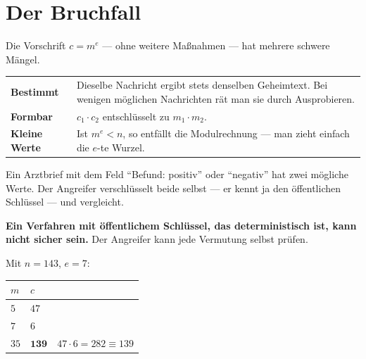 \begin{merksatz}
\begin{center}
\begin{minipage}{0.88\textwidth}
\end{minipage}
\end{center}
\end{merksatz}

\section{Der Bruchfall}

\begin{warnung}
Die Vorschrift $c = m^{e}$ --- ohne weitere Maßnahmen --- hat mehrere schwere Mängel.

\begin{center}
{\small
\renewcommand{\arraystretch}{1.52}
\begin{tabular}{@{}P{2.4cm}P{6.2cm}@{}}
\toprule
\textbf{Bestimmt} & Dieselbe Nachricht ergibt stets denselben Geheimtext. Bei wenigen möglichen Nachrichten rät man sie durch Ausprobieren.\\
\textbf{Formbar} & $c_1\cdot c_2$ entschlüsselt zu $m_1\cdot m_2$.\\
\textbf{Kleine Werte} & Ist $m^{e} < n$, so entfällt die Modulrechnung --- man zieht einfach die $e$-te Wurzel.\\
\bottomrule
\end{tabular}}
\end{center}

Ein Arztbrief mit dem Feld \enquote{Befund: positiv} oder \enquote{negativ} hat zwei mögliche Werte. Der Angreifer verschlüsselt beide selbst --- er kennt ja den öffentlichen Schlüssel --- und vergleicht.

\begin{center}
\begin{minipage}{0.9\textwidth}
\textbf{Ein Verfahren mit öffentlichem Schlüssel, das deterministisch ist, kann nicht sicher sein.} Der Angreifer kann jede Vermutung selbst prüfen.
\end{minipage}
\end{center}

Mit $n=143$, $e=7$:
\begin{center}
\renewcommand{\arraystretch}{1.46}
\begin{tabular}{@{}P{2.0cm}P{2.0cm}P{2.4cm}@{}}
\toprule
$m$ & $c$ & \\
\midrule
$5$ & $47$ & \\
$7$ & $6$ & \\
\midrule
$35$ & $\mathbf{139}$ & $47\cdot6 = 282 \equiv 139$\\
\bottomrule
\end{tabular}
\end{center}


\end{warnung}
